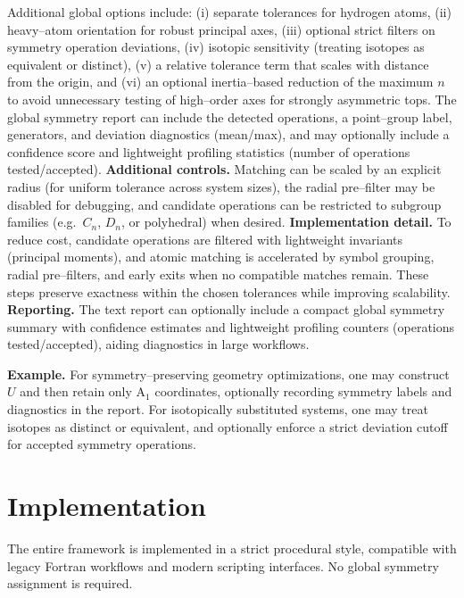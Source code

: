 \documentclass[11pt,a4paper]{article}
\begin{document}
Additional global options include: (i) separate tolerances for hydrogen atoms,
(ii) heavy--atom orientation for robust principal axes, (iii) optional strict
filters on symmetry operation deviations, (iv) isotopic sensitivity
(treating isotopes as equivalent or distinct), (v) a relative tolerance term
that scales with distance from the origin, and (vi) an optional inertia--based
reduction of the maximum $n$ to avoid unnecessary testing of high--order axes
for strongly asymmetric tops. The global symmetry report can include the
detected operations, a point--group label, generators, and deviation diagnostics
(mean/max), and may optionally include a confidence score and lightweight
profiling statistics (number of operations tested/accepted).
\medskip
\noindent\textbf{Additional controls.} Matching can be scaled by an explicit
radius (for uniform tolerance across system sizes), the radial pre--filter may
be disabled for debugging, and candidate operations can be restricted to
subgroup families (e.g.\ $C_n$, $D_n$, or polyhedral) when desired.
\medskip
\noindent\textbf{Implementation detail.} To reduce cost, candidate operations are filtered with
lightweight invariants (principal moments), and atomic matching is accelerated by
symbol grouping, radial pre--filters, and early exits when no compatible matches
remain. These steps preserve exactness within the chosen tolerances while improving
scalability.
\medskip
\noindent\textbf{Reporting.} The text report can optionally include a compact global
symmetry summary with confidence estimates and lightweight profiling counters
(operations tested/accepted), aiding diagnostics in large workflows.

\noindent\textbf{Example.} For symmetry--preserving geometry optimizations, one may
construct $U$ and then retain only A$_1$ coordinates, optionally recording symmetry
labels and diagnostics in the report.
For isotopically substituted systems, one may treat isotopes as distinct or
equivalent, and optionally enforce a strict deviation cutoff for accepted
symmetry operations.

\section{Implementation}

The entire framework is implemented in a strict procedural style,
compatible with legacy Fortran workflows and modern scripting interfaces.
No global symmetry assignment is required.
\end{document}

